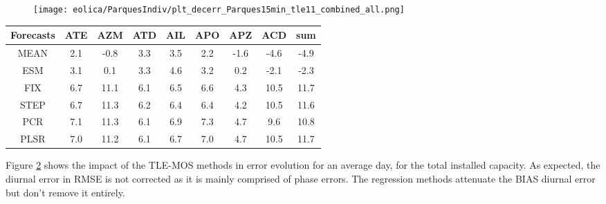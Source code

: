 \begin{figure}[!htp]
    \centering
    \texttt{[image: eolica/ParquesIndiv/plt\_decerr\_Parques15min\_tle11\_combined\_all.png]}
    \label{fig:decerr_tle11_parks}
\end{figure}
\FloatBarrier


\begin{table}[!htp]
    \small
    \centering
    \label{tb:decerr_tle11_ssrmse}
    \begin{tabular}{ccccccccc}
    \toprule
    Forecasts & ATE & AZM & ATD & AIL & APO & APZ & ACD & sum \\ 
    \midrule
    MEAN & 2.1 & -0.8 & 3.3 & 3.5 & 2.2 & -1.6 & -4.6 & -4.9 \\ 
    ESM & 3.1 & 0.1 & 3.3 & 4.6 & 3.2 & 0.2 & -2.1 & -2.3 \\ 
    FIX & 6.7 & 11.1 & 6.1 & 6.5 & 6.6 & 4.3 & 10.5 & 11.7 \\ 
    STEP & 6.7 & 11.3 & 6.2 & 6.4 & 6.4 & 4.2 & 10.5 & 11.6 \\ 
    PCR & 7.1 & 11.3 & 6.1 & 6.9 & 7.3 & 4.7 & 9.6 & 10.8 \\ 
    PLSR & 7.0 & 11.2 & 6.1 & 6.7 & 7.0 & 4.7 & 10.5 & 11.7 \\ 
    \bottomrule
    \end{tabular}
\end{table}
\FloatBarrier

Figure \ref{fig:decerr_tle11} shows the impact of the TLE-MOS methods in error evolution for an average day, for the total installed capacity. As expected, the diurnal error in RMSE is not corrected as it is mainly comprised of phase errors. The regression methods attenuate the BIAS diurnal error but don't remove it entirely.

\begin{figure}[!htp]
    \centering
    \label{fig:decerr_tle11}
\end{figure}
\FloatBarrier

